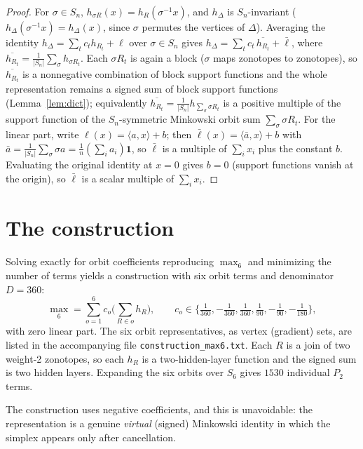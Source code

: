 \documentclass[11pt]{article}
\theoremstyle{definition}
\begin{document}
\begin{proof}
For $\sigma\in S_n$, $h_{\sigma R}(x)=h_R(\sigma^{-1}x)$, and $h_\Delta$ is $S_n$-invariant
($h_\Delta(\sigma^{-1}x)=h_\Delta(x)$, since $\sigma$ permutes the vertices of $\Delta$). Averaging the
identity $h_\Delta=\sum_t c_t h_{R_t}+\ell$ over $\sigma\in S_n$ gives $h_\Delta=\sum_t c_t\,
\overline{h_{R_t}}+\bar\ell$, where $\overline{h_{R_t}}=\tfrac1{|S_n|}\sum_\sigma h_{\sigma R_t}$. Each
$\sigma R_t$ is again a block ($\sigma$ maps zonotopes to zonotopes), so $\overline{h_{R_t}}$ is a
nonnegative combination of block support functions and the whole representation remains a signed sum of
block support functions (Lemma~\ref{lem:dict}); equivalently $\overline{h_{R_t}}=\tfrac1{|S_n|}
h_{\sum_\sigma\sigma R_t}$ is a positive multiple of the support function of the $S_n$-symmetric Minkowski
orbit sum $\sum_\sigma\sigma R_t$. For the linear part, write $\ell(x)=\langle a,x\rangle+b$; then
$\bar\ell(x)=\langle\bar a,x\rangle+b$ with $\bar a=\tfrac1{|S_n|}\sum_\sigma\sigma a=\tfrac1n(\sum_i a_i)
\mathbf 1$, so $\bar\ell$ is a multiple of $\sum_i x_i$ plus the constant $b$. Evaluating the original
identity at $x=0$ gives $b=0$ (support functions vanish at the origin), so $\bar\ell$ is a scalar multiple
of $\sum_i x_i$.
\end{proof}

\section{The construction}

Solving exactly for orbit coefficients reproducing $\max_6$ and minimizing the number of terms yields a
construction with six orbit terms and denominator $D=360$:
\[
   \max_6 = \sum_{o=1}^{6} c_o \Big(\sum_{R\in o} h_R\Big), \qquad
   c_o \in \Big\{ \tfrac{1}{360}, -\tfrac{1}{360}, \tfrac{1}{360}, \tfrac{1}{90}, -\tfrac{1}{90}, -\tfrac{1}{180} \Big\},
\]
with zero linear part. The six orbit representatives, as vertex (gradient) sets, are listed in the
accompanying file \texttt{construction\_max6.txt}. Each $R$ is a join of two weight-2 zonotopes, so each
$h_R$ is a two-hidden-layer function and the signed sum is two hidden layers. Expanding the six orbits
over $S_6$ gives $1530$ individual $P_2$ terms.

The construction uses negative coefficients, and this is unavoidable: the representation is a genuine
\emph{virtual} (signed) Minkowski identity in which the simplex appears only after cancellation.
\end{document}
